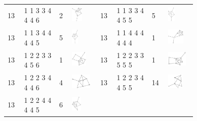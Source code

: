 \begin{footnotesize}
\begin{longtable}{
        m{0.05\linewidth} m{0.15\linewidth} m{0.05\linewidth} m{0.12\linewidth} |
        m{0.05\linewidth} m{0.15\linewidth} m{0.05\linewidth} m{0.12\linewidth}
    }
13 & 1 1 3 3 4 4 4 6 & 2 & \includegraphics[height=0.7151cm]{15-universal-graphs/img/degree-sequences-example-graphs/graph-4-8-34} &
13 & 1 1 3 3 4 4 5 5 & 5 & \includegraphics[height=0.7151cm]{15-universal-graphs/img/degree-sequences-example-graphs/graph-4-8-35}\\
13 & 1 1 3 4 4 4 4 5 & 5 & \includegraphics[height=0.7151cm]{15-universal-graphs/img/degree-sequences-example-graphs/graph-4-8-36} &
13 & 1 1 4 4 4 4 4 4 & 1 & \includegraphics[height=0.7151cm]{15-universal-graphs/img/degree-sequences-example-graphs/graph-4-8-37}\\
13 & 1 2 2 3 3 4 5 6 & 1 & \includegraphics[height=0.7151cm]{15-universal-graphs/img/degree-sequences-example-graphs/graph-4-8-38} &
13 & 1 2 2 3 3 5 5 5 & 1 & \includegraphics[height=0.7151cm]{15-universal-graphs/img/degree-sequences-example-graphs/graph-4-8-39}\\
13 & 1 2 2 3 4 4 4 6 & 4 & \includegraphics[height=0.7151cm]{15-universal-graphs/img/degree-sequences-example-graphs/graph-4-8-40} &
13 & 1 2 2 3 4 4 5 5 & 14 & \includegraphics[height=0.7151cm]{15-universal-graphs/img/degree-sequences-example-graphs/graph-4-8-41}\\
13 & 1 2 2 4 4 4 4 5 & 6 & \includegraphics[height=0.7151cm]{15-universal-graphs/img/degree-sequences-example-graphs/graph-4-8-42} &

\end{longtable}
\end{footnotesize}
